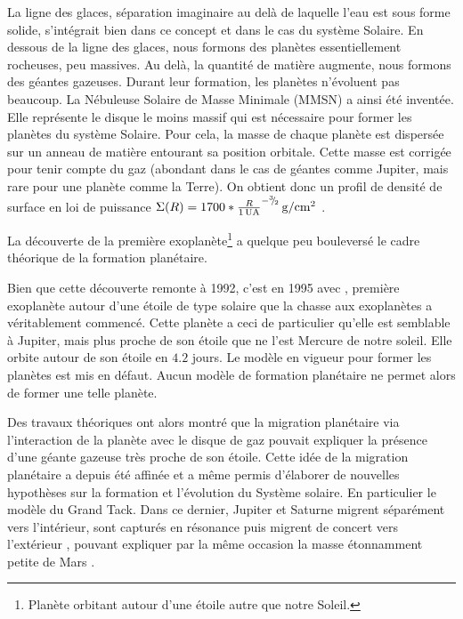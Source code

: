 La ligne des glaces, séparation imaginaire au delà de laquelle l'eau est sous forme solide, s'intégrait bien dans ce concept et
dans le cas du système Solaire. En dessous de la ligne des glaces, nous formons des planètes essentiellement rocheuses, peu
massives. Au delà, la quantité de matière augmente, nous formons des géantes gazeuses. Durant leur formation, les planètes
n'évoluent pas beaucoup. La Nébuleuse Solaire de Masse Minimale (MMSN) a ainsi été inventée. Elle représente le disque le moins
massif qui est nécessaire pour former les planètes du système Solaire. Pour cela, la masse de chaque planète est dispersée
sur un anneau de matière entourant sa position orbitale.
Cette masse est corrigée pour tenir compte du gaz (abondant dans le cas de géantes comme Jupiter, mais rare pour une planète
comme la Terre). On obtient donc un profil de densité de surface en loi de puissance $\Sigma(R)=1700 * \frac{R}{1\mathrm{\thinspace UA}}^{-{{}^{3\!\!}/ _{\!2}}}\mathrm{\thinspace g/cm^2}$ \citep{
weidenschilling1977distribution, hayashi1981structure}.

La découverte de la première exoplanète\footnote{Planète orbitant autour d'une étoile autre que notre Soleil.}
\citep{wolszczan1992planetary} a quelque peu bouleversé le cadre théorique de la formation planétaire.

Bien que cette découverte remonte à 1992, c'est en 1995 avec  \citep{mayor1995jupiter}, première exoplanète autour d'une étoile de type solaire que la chasse aux
exoplanètes a véritablement commencé. Cette planète a ceci de particulier qu'elle est semblable à Jupiter, mais plus proche de
son étoile que ne l'est Mercure de notre soleil. Elle orbite autour de son étoile en $4.2$ jours. Le modèle en
vigueur pour former les planètes est mis en défaut. Aucun modèle de formation planétaire ne permet alors de former une telle
planète. 

Des travaux théoriques ont alors montré que la migration planétaire via l'interaction de la planète avec le disque de gaz
pouvait expliquer la présence d'une géante gazeuse très proche de son étoile. Cette idée de la migration planétaire a depuis été
affinée et a même permis d'élaborer de nouvelles hypothèses sur la formation et l'évolution du Système solaire. En particulier
le modèle du \og Grand Tack\fg \citep{walsh2011low}. Dans ce dernier, Jupiter et
Saturne migrent séparément vers l'intérieur, sont capturés en résonance puis migrent de concert vers l'extérieur \citep{morbidelli2007dynamics, pierens2011twophase}, pouvant
expliquer par la même occasion la masse étonnamment petite de Mars \citep{walsh2011low}. 

